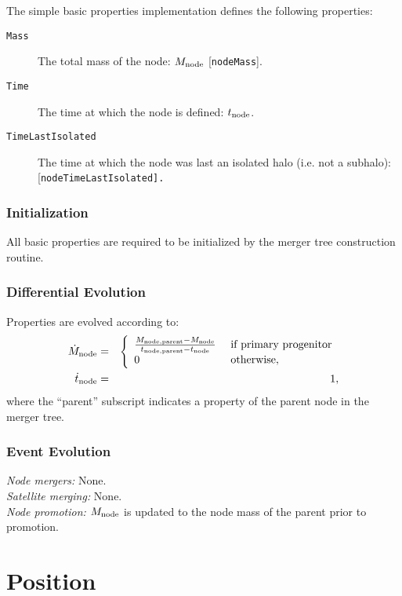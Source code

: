 The simple basic properties implementation defines the following properties:
\begin{description}
 \item [{\tt Mass}] The total mass of the node: $M_{\rm node}$ [{\tt nodeMass}].
 \item [{\tt Time}] The time at which the node is defined: $t_{\rm node}$.
 \item [{\tt TimeLastIsolated}] The time at which the node was last an isolated halo (i.e. not a subhalo): [\tt nodeTimeLastIsolated].
\end{description}

\subsubsection{Initialization}

All basic properties are required to be initialized by the merger tree construction routine.

\subsubsection{Differential Evolution}

Properties are evolved according to:
\begin{eqnarray}
 \dot{M}_{\rm node} &=& \left\{\begin{array}{ll}{M_{\rm node, parent} - M_{\rm node} \over t_{\rm node, parent} - t_{\rm node}} & \hbox{ if primary progenitor} \\ 0 & \hbox{ otherwise}, \end{array} \right. \\
 \dot{t}_{\rm node} &=& 1,
\end{eqnarray}
where the ``parent'' subscript indicates a property of the parent node in the merger tree.

\subsubsection{Event Evolution}

\noindent\emph{Node mergers:} None.\\

\noindent\emph{Satellite merging:} None.\\

\noindent\emph{Node promotion:} $M_{\rm node}$ is updated to the node mass of the parent prior to promotion.\\

\section{Position}\label{sec:ComponentPosition}

